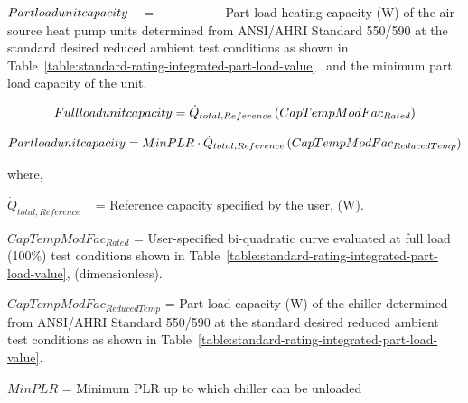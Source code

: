\(Part{\rm{ }}load{\rm{ }}unit{\rm{ }}capacity\) ~ = ~~~~~~~~~~ Part load heating capacity (W) of the air-source heat pump units determined from ANSI/AHRI Standard 550/590 at the standard desired reduced ambient test conditions as shown in Table~\ref{table:standard-rating-integrated-part-load-value} ~and the minimum part load capacity of the unit.

\begin{equation}
Full{\rm{ }}load{\rm{ }}unit{\rm{ }}capacity = {\dot Q_{total,Reference}}\left( {CapTempModFa{c_{Rated}}} \right)
\end{equation}

\begin{equation}
Part{\rm{ }}load{\rm{ }}unit{\rm{ }}capacity = MinPLR \cdot {\dot Q_{total,Reference}}\left( {CapTempModFa{c_{ReducedTemp}}} \right)
\end{equation}

where,

\({\dot Q_{total,Reference}}\) ~ = Reference capacity specified by the user, (W).

\(CapTempModFa{c_{Rated}}\) = User-specified bi-quadratic curve evaluated at full load (100\%) test conditions shown in Table~\ref{table:standard-rating-integrated-part-load-value}, (dimensionless).

\(CapTempModFa{c_{ReducedTemp}}\) = Part load capacity (W) of the chiller determined from ANSI/AHRI Standard 550/590 at the standard desired reduced ambient test conditions as shown in Table~\ref{table:standard-rating-integrated-part-load-value}.

\(MinPLR\) = Minimum PLR up to which chiller can be unloaded

